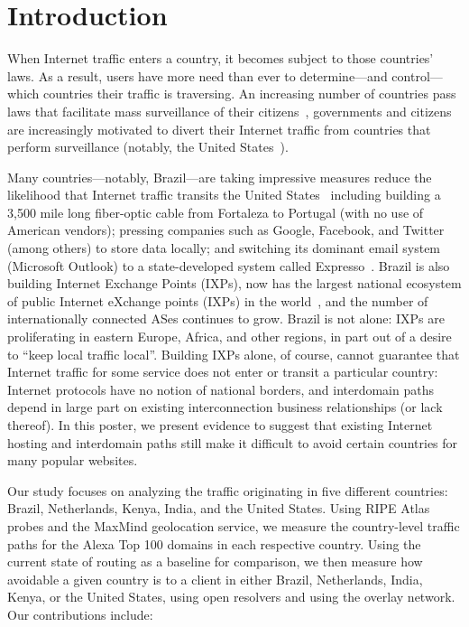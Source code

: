 \section{Introduction}

When Internet traffic enters a country, it becomes subject to those
countries' laws.  As a result, users have more need than ever to
determine---and control---which countries their traffic is traversing.
An increasing number of countries pass laws that facilitate mass
surveillance of their citizens~\cite{
  netherlands_surveillance, uk_bill}, governments
and citizens are increasingly motivated to divert their Internet traffic
from countries that perform surveillance (notably, the United
States~\cite{brazil_break_from_US}).

Many countries---notably, Brazil---are taking impressive measures reduce
the likelihood that Internet traffic transits the United
States~\cite{brazil_break_from_US} including building a 3,500
mile long fiber-optic cable from Fortaleza to Portugal (with no use of
American vendors); pressing companies such as Google, Facebook, and
Twitter (among others) to store data locally; and switching its dominant
email system (Microsoft Outlook) to a state-developed system called
Expresso~\cite{brazil_cable}.  Brazil is also
building Internet Exchange Points (IXPs), now has the
largest national ecosystem of public Internet eXchange points (IXPs) in
the world~\cite{brazil_ixp_ecosystem}, and the number of internationally
connected ASes continues to
grow. Brazil is not alone: IXPs are
proliferating in eastern Europe, Africa, and other regions, in part out
of a desire to ``keep local traffic local''. Building IXPs alone, of
course, cannot guarantee that Internet traffic for some service does not
enter or transit a particular country: Internet protocols have no notion
of national borders, and interdomain paths depend in large part on
existing interconnection business relationships (or lack thereof).  In
this poster, we present evidence to suggest that existing Internet
hosting and interdomain paths still make it difficult to avoid certain
countries for many popular websites. 

Our study focuses on analyzing the traffic originating in
five different countries: Brazil, Netherlands, Kenya, India, and the
United States.  Using RIPE Atlas probes and the MaxMind geolocation
service, we measure the country-level traffic paths for the Alexa Top
100 domains in each respective country.  Using the current state of
routing as a baseline for comparison, we then measure how avoidable a
given country is to a client in either Brazil, Netherlands, India,
Kenya, or the United States, using open resolvers and using the overlay
network.  Our contributions include: 

